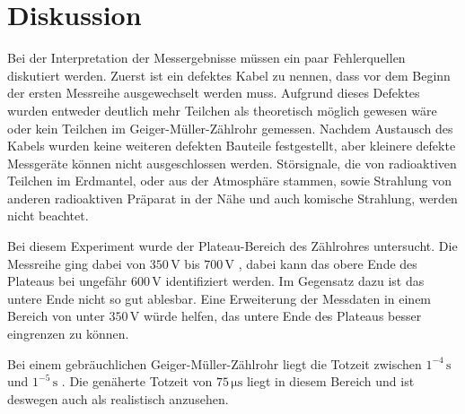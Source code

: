 \section{Diskussion}
\label{sec:Diskussion}

Bei der Interpretation der Messergebnisse müssen ein paar Fehlerquellen diskutiert werden.
Zuerst ist ein defektes Kabel zu nennen, dass vor dem Beginn der ersten Messreihe ausgewechselt werden muss. Aufgrund dieses Defektes wurden entweder deutlich mehr Teilchen als theoretisch möglich gewesen wäre oder kein Teilchen im Geiger-Müller-Zählrohr gemessen.
Nachdem Austausch des Kabels wurden keine weiteren defekten Bauteile festgestellt, aber kleinere defekte Messgeräte können nicht ausgeschlossen werden.
Störsignale, die von radioaktiven Teilchen im Erdmantel, oder aus der Atmosphäre stammen, sowie Strahlung von anderen radioaktiven Präparat in der Nähe und auch komische Strahlung, werden nicht beachtet.

Bei diesem Experiment wurde der Plateau-Bereich des Zählrohres untersucht. Die Messreihe ging dabei von $350 \,\unit{\volt}$ bis $700 \,\unit{\volt}$ , dabei kann das obere Ende des Plateaus bei ungefähr $600 \, \unit{\volt}$ identifiziert werden.
Im Gegensatz dazu ist das untere Ende nicht so gut ablesbar. Eine Erweiterung der Messdaten in einem Bereich von unter $350 \, \unit{\volt}$ würde helfen, das untere Ende des Plateaus besser eingrenzen zu können.

Bei einem gebräuchlichen Geiger-Müller-Zählrohr liegt die Totzeit zwischen $1^{-4} \, \unit{\second}$ und $1^{-5} \, \unit{\second}$ \cite{ap01}. Die genäherte Totzeit von $ 75 \,\unit{\micro\second}$ liegt in diesem Bereich und ist deswegen auch als realistisch anzusehen.